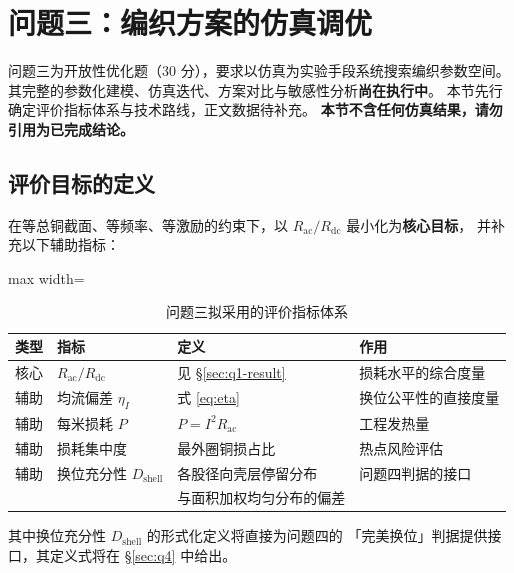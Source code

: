 \documentclass[12pt, a4paper]{ctexart}
\newcommand{\Rac}{R_{\mathrm{ac}}}
\newcommand{\Rdc}{R_{\mathrm{dc}}}
\begin{document}
\section{问题三：编织方案的仿真调优}
\label{sec:q3}

\begin{todobox}[本节状态说明]
问题三为开放性优化题（30 分），要求以仿真为实验手段系统搜索编织参数空间。
其完整的参数化建模、仿真迭代、方案对比与敏感性分析\textbf{尚在执行中}。
本节先行确定评价指标体系与技术路线，正文数据待补充。
\textbf{本节不含任何仿真结果，请勿引用为已完成结论。}
\end{todobox}

\subsection{评价目标的定义}

在等总铜截面、等频率、等激励的约束下，以 $\Rac/\Rdc$ 最小化为\textbf{核心目标}，
并补充以下辅助指标：

\begin{table}[H]
\centering
\caption{问题三拟采用的评价指标体系}
\label{tab:q3-metrics}
\small
\begin{adjustbox}{max width=\textwidth}
\begin{tabular}{c l l l}
\toprule
\textbf{类型} & \textbf{指标} & \textbf{定义} & \textbf{作用} \\
\midrule
核心 & $\Rac/\Rdc$ & 见 \S\ref{sec:q1-result} & 损耗水平的综合度量 \\
辅助 & 均流偏差 $\eta_I$ & 式 \eqref{eq:eta} & 换位公平性的直接度量 \\
辅助 & 每米损耗 $P$ & $P = I^2\Rac$ & 工程发热量 \\
辅助 & 损耗集中度 & 最外圈铜损占比 & 热点风险评估 \\
辅助 & 换位充分性 $D_{\mathrm{shell}}$ & 各股径向壳层停留分布 & 问题四判据的接口 \\
 & & 与面积加权均匀分布的偏差 & \\
\bottomrule
\end{tabular}
\end{adjustbox}
\end{table}

其中换位充分性 $D_{\mathrm{shell}}$ 的形式化定义将直接为问题四的
「完美换位」判据提供接口，其定义式将在 \S\ref{sec:q4} 中给出。
\end{document}
